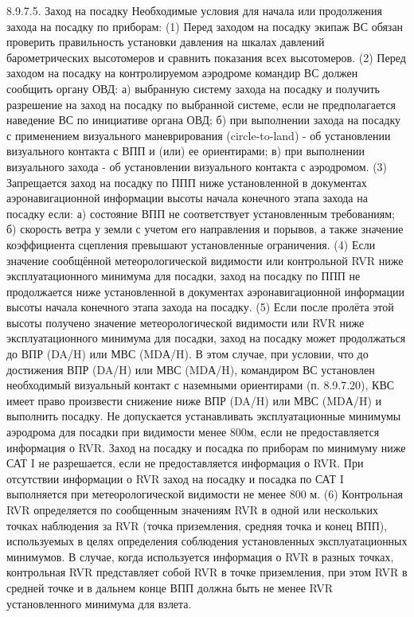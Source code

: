 8.9.7.5.	Заход на посадку
Необходимые условия для начала или продолжения захода на посадку по приборам:
(1) Перед заходом на посадку экипаж ВС обязан проверить правильность установки давления на шкалах давлений барометрических высотомеров и сравнить показания всех высотомеров.
(2) Перед заходом на посадку на контролируемом аэродроме командир ВС должен сообщить органу ОВД: 
а)	выбранную систему захода на посадку и получить разрешение на заход на посадку по выбранной системе, если не предполагается наведение ВС по инициативе органа ОВД;
б)	при выполнении захода на посадку с применением визуального маневрирования (circle-to-land) - об установлении визуального контакта с ВПП и (или) ее ориентирами;
в)	при выполнении визуального захода - об установлении визуального контакта с аэродромом.
(3) Запрещается заход на посадку по ППП ниже установленной в документах аэронавигационной информации высоты начала конечного этапа захода на посадку если:
а)	состояние ВПП не соответствует установленным требованиям;
б)	скорость ветра у земли с учетом его направления и порывов, а также значение коэффициента сцепления превышают установленные ограничения.
(4) Если значение сообщённой метеорологической видимости или контрольной RVR ниже эксплуатационного минимума для посадки, заход на посадку по ППП не продолжается ниже установленной в документах аэронавигационной информации высоты начала конечного этапа захода на посадку. 
(5) Если после пролёта этой высоты получено значение метеорологической видимости или RVR ниже эксплуатационного минимума для посадки, заход на посадку может продолжаться до ВПР (DA/H) или МВС (MDА/H). В этом случае, при условии, что до достижения ВПР (DA/H) или МВС (MDА/H), командиром ВС установлен необходимый визуальный контакт с наземными ориентирами (п. 8.9.7.20), КВС имеет право произвести снижение ниже ВПР (DA/H) или МВС (MDА/H) и выполнить посадку. 
Не допускается устанавливать эксплуатационные минимумы аэродрома для посадки при видимости менее 800м, если не предоставляется информация о RVR.
Заход на посадку и посадка по приборам по минимуму ниже САТ I не разрешается, если не предоставляется информация о RVR. При отсутствии информации о RVR заход на посадку и посадка по САТ I выполняется при метеорологической видимости не менее 800 м.
(6) Контрольная RVR определяется по сообщенным значениям RVR в одной или нескольких точках наблюдения за RVR (точка приземления, средняя точка и конец ВПП), используемых в целях определения соблюдения установленных эксплуатационных минимумов. В случае, когда используется информация о RVR в разных точках, контрольная RVR представляет собой RVR в точке приземления, при этом RVR в средней точке и в дальнем конце ВПП должна быть не менее RVR установленного минимума для взлета. 

